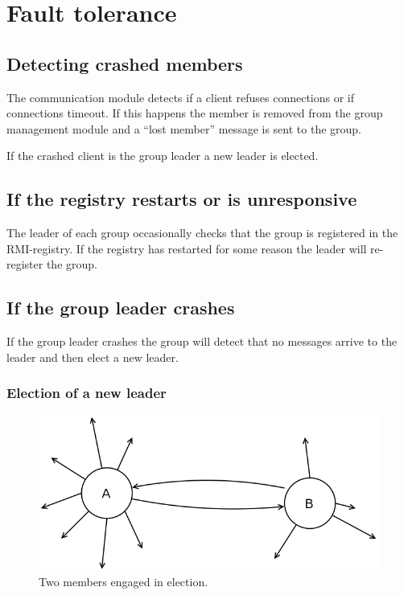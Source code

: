 \documentclass[a4paper,english]{article}
\begin{document}
\section{Fault tolerance}
\subsection{Detecting crashed members}
The communication module detects if a client refuses connections or if connections timeout. If this happens the member is removed from the group management module and a ``lost member'' message is sent to the group.

If the crashed client is the group leader a new leader is elected.

\subsection{If the registry restarts or is unresponsive}
The leader of each group occasionally checks that the group is registered in the RMI-registry. If the registry has restarted for some reason the leader will re-register the group.

\subsection{If the group leader crashes}
If the group leader crashes the group will detect that no messages arrive to the leader and then elect a new leader. 

\subsubsection{Election of a new leader}

\begin{figure}
\includegraphics[width=\textwidth]{Election.png}
\caption{Two members engaged in election.}
\label{fig:election}
\end{figure}
\end{document}
